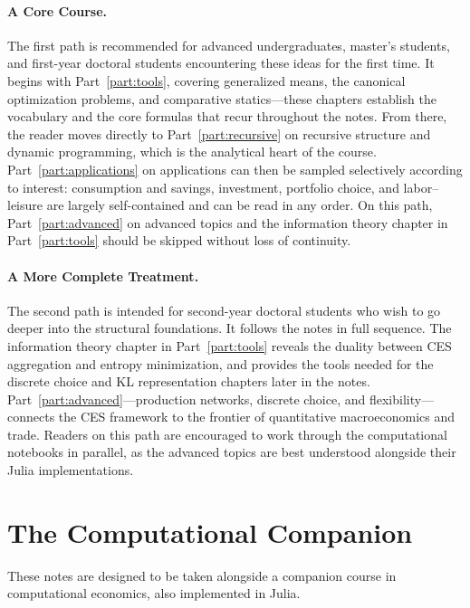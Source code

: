 \paragraph{A Core Course.}
The first path is recommended for advanced undergraduates, master's students, and first-year doctoral students encountering these ideas for the first time.
It begins with Part~\ref{part:tools}, covering generalized means, the canonical optimization problems, and comparative statics---these chapters establish the vocabulary and the core formulas that recur throughout the notes.
From there, the reader moves directly to Part~\ref{part:recursive} on recursive structure and dynamic programming, which is the analytical heart of the course.
Part~\ref{part:applications} on applications can then be sampled selectively according to interest: consumption and savings, investment, portfolio choice, and labor--leisure are largely self-contained and can be read in any order.
On this path, Part~\ref{part:advanced} on advanced topics and the information theory chapter in Part~\ref{part:tools} should be skipped without loss of continuity.

\paragraph{A More Complete Treatment.}
The second path is intended for second-year doctoral students who wish to go deeper into the structural foundations.
It follows the notes in full sequence.
The information theory chapter in Part~\ref{part:tools} reveals the duality between CES aggregation and entropy minimization, and provides the tools needed for the discrete choice and KL representation chapters later in the notes.
Part~\ref{part:advanced}---production networks, discrete choice, and flexibility---connects the CES framework to the frontier of quantitative macroeconomics and trade.
Readers on this path are encouraged to work through the computational notebooks in parallel, as the advanced topics are best understood alongside their Julia implementations.

\section{The Computational Companion}
\label{sec:companion}

These notes are designed to be taken alongside a companion course in computational economics, also implemented in Julia.

